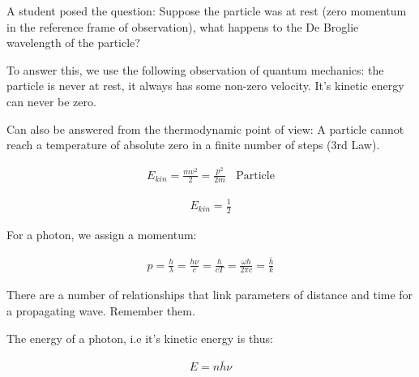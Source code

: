 A student posed the question: Suppose the particle was at rest (zero momentum in the reference frame of observation), what happens to the De Broglie wavelength of the particle?

To answer this, we use the following observation of quantum mechanics: the particle is never at rest, it always has some non-zero velocity. It's kinetic energy can never be zero.

Can also be answered from the thermodynamic point of view: A particle cannot reach a temperature of absolute zero in a finite number of steps (3rd Law).

\begin{align*}
  E_{kin} = \frac{mv^2}{2} = \frac{p^2}{2m}~~~~\text{Particle}
\end{align*}

\begin{align*}
  E_{kin} = \frac{1}{2}
\end{align*}

For a photon, we assign a momentum:

\begin{align*}
  p = \frac{h}{\lambda} = \frac{h\nu}{c} = \frac{h}{cT} = \frac{\omega h}{2\pi c} = \frac{\bar{h}}{k}
\end{align*}

There are a number of relationships that link parameters of distance and time for a propagating wave. Remember them.

The energy of a photon, i.e it's kinetic energy is thus:

\begin{align*}
  E = n\bar{h}\nu
\end{align*}


